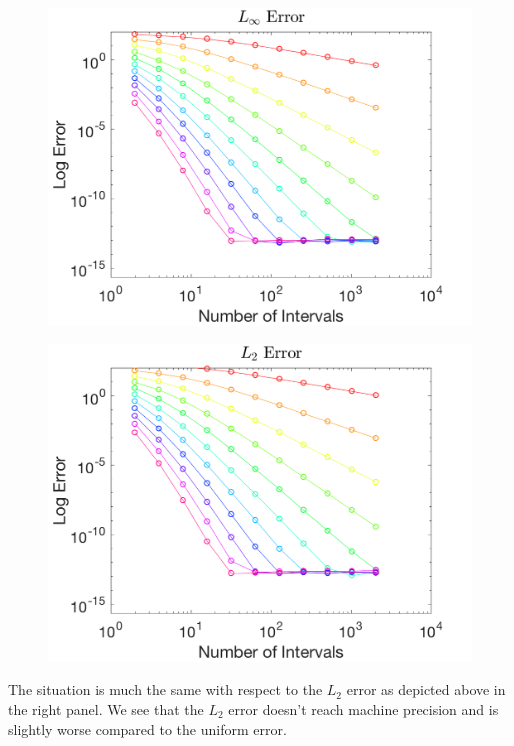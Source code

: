 \documentclass{article}
\begin{document}
\begin{figure}[H]
  \centering
  \begin{minipage}{.6\textwidth}
    \centering
    \includegraphics[width=\linewidth]{maxError_0.png}
    \label{fig:max0}
  \end{minipage}%
  \begin{minipage}{.6\textwidth}
    \centering
    \includegraphics[width=\linewidth]{squareError_0.png}
    \label{fig:square0}
  \end{minipage}%
\end{figure}

\noindent The situation is much the same with respect to the $L_2$ error as depicted above in the right panel. We see that the $L_2$ error doesn't reach machine precision and is slightly worse compared to the uniform error. \newline
\end{document}
